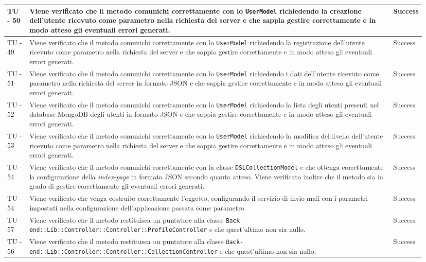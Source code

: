 \begin{center}
\begin{longtable}{ | p{3cm} | p{9cm} | p{2cm} | }
TU - 50 & Viene verificato che il metodo comunichi correttamente con lo \texttt{UserModel} richiedendo la creazione dell'utente ricevuto come parametro nella richiesta del server e che sappia gestire correttamente e in modo atteso gli eventuali errori generati. & Success \\ \hline
TU - 49 & Viene verificato che il metodo comunichi correttamente con lo \texttt{UserModel} richiedendo la registrazione dell'utente ricevuto come parametro nella richiesta del server e che sappia gestire correttamente e in modo atteso gli eventuali errori generati. & Success \\ \hline
TU - 51 & Viene verificato che il metodo comunichi correttamente con lo \texttt{UserModel} richiedendo i dati dell'utente ricevuto come parametro nella richiesta del server in formato JSON e che sappia gestire correttamente e in modo atteso gli eventuali errori generati. & Success \\ \hline
TU - 52 & Viene verificato che il metodo comunichi correttamente con lo \texttt{UserModel} richiedendo la lista degli utenti presenti nel database MongoDB degli utenti in formato JSON e che sappia gestire correttamente e in modo atteso gli eventuali errori generati. & Success \\ \hline
TU - 53 & Viene verificato che il metodo comunichi correttamente con lo \texttt{UserModel} richiedendo la modifica del livello dell'utente ricevuto come parametro nella richiesta del server e che sappia gestire correttamente e in modo atteso gli eventuali errori generati. & Success \\ \hline
TU - 54 & Viene verificato che il metodo comunichi correttamente con la classe \texttt{DSLCollectionModel} e che ottenga correttamente la configurazione della \textit{index-page} in formato JSON secondo quanto atteso. Viene verificato inoltre che il metodo sia in grado di gestire correttamente gli eventuali errori generati. & Success \\ \hline
TU - 54 & Viene verificato che venga costruito correttamente l'oggetto, configurando il servizio di invio mail con i parametri impostati nella configurazione dell'applicazione passata come parametro. & Success \\ \hline
TU - 57 & Viene verificato che il metodo restituisca un puntatore alla classe \texttt{Back-end::Lib::Controller::Controller::ProfileController} e che quest'ultimo non sia nullo. & Success \\ \hline
TU - 56 & Viene verificato che il metodo restituisca un puntatore alla classe \texttt{Back-end::Lib::Controller::Controller::CollectionController} e che quest'ultimo non sia nullo. & Success \\ \hline

\end{longtable}
\end{center}

